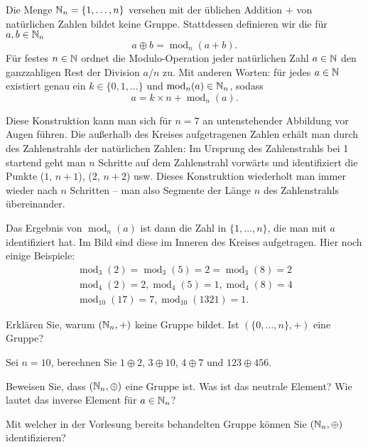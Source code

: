 \documentclass{scrartcl}
\renewcommand{\mod}{\operatorname{mod}}
\begin{document}
Die Menge $\mathbb{N}_n = \{1,\ldots,n\}$ versehen mit der üblichen Addition $+$ von natürlichen Zahlen bildet keine Gruppe.
Stattdessen definieren wir die  für $a, b \in \mathbb{N}_n$
\[
  a \oplus b = \mod_n(a + b).
\]
Für festes $n \in \mathbb{N}$ ordnet die Modulo-Operation jeder natürlichen Zahl $a \in \mathbb{N}$ den ganzzahligen Rest der Division $a / n$ zu.
Mit anderen Worten: für jedes $a \in \mathbb{N}$ existiert genau ein $k \in \{0, 1, \ldots \}$ und $\mod_n(a) \in \NN_n$, sodass
\[
  a = k \times n + \mod_n(a).
\]

Diese Konstruktion kann man sich für $n=7$ an untenstehender Abbildung vor Augen führen.
Die außerhalb des Kreises aufgetragenen Zahlen erhält man durch  des Zahlenstrahls der natürlichen Zahlen:
Im Ursprung des Zahlenstrahls bei 1 startend geht man $n$ Schritte auf dem Zahlenstrahl vorwärts und identifiziert die Punkte ($1$, $n+1$), ($2$, $n+2$) usw.
Dieses Konstruktion wiederholt man immer wieder nach $n$ Schritten -- man  also Segmente der Länge $n$ des Zahlenstrahls übereinander.

Das Ergebnis von $\mod_n(a)$ ist dann die Zahl in $\{1,\ldots,n\}$, die man mit $a$ identifiziert hat.
Im Bild sind diese im Inneren des Kreises aufgetragen.
Hier noch einige Beispiele:
\begin{align*}
  \mod_3(2) = \mod_3(5)=2 = \mod_3(8)= 2 \\
  \mod_4(2) = 2, \mod_4(5) = 1, \mod_4(8) = 4\\
  \mod_{10}(17) = 7, \mod_{10}(1321) = 1.
\end{align*}
  
\begin{subex}
  \item Erklären Sie, warum $(\mathbb{N}_n, +)$ keine Gruppe bildet.
  Ist $(\{0, \ldots, n\},+)$ eine Gruppe?
  \item Sei $n=10$, berechnen Sie $1 \oplus 2$, $3 \oplus 10$, $4 \oplus 7$ und $123 \oplus 456$.
  \item Beweisen Sie, dass $(\mathbb{N}_n,\oplus)$ eine Gruppe ist.
  Was ist das neutrale Element?
  Wie lautet das inverse Element für $a\in\mathbb{N}_n$?
  \item Mit welcher in der Vorlesung bereits behandelten Gruppe können Sie $(\mathbb{N}_n,\oplus)$ identifizieren?
\end{subex}

\begin{center}
\end{center}
\end{document}
